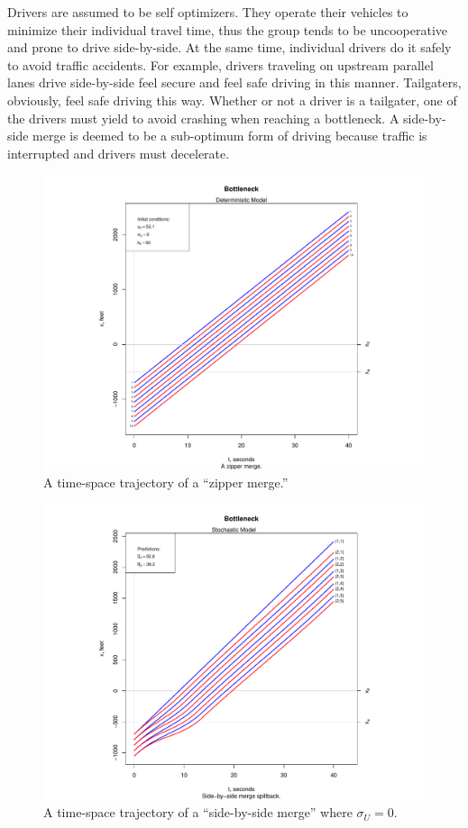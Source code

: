 \documentclass[Proceedings]{ascelike}
\begin{document}
Drivers are assumed to be self optimizers.  They operate their vehicles to minimize their individual travel time, thus the group tends to be uncooperative and prone to drive side-by-side. At the same time, individual drivers do it safely to avoid traffic accidents. For example, drivers traveling on upstream parallel lanes drive side-by-side feel secure and feel safe driving in this manner. Tailgaters, obviously, feel safe driving this way. Whether or not a driver is a tailgater, one of the drivers must yield to avoid crashing when reaching a bottleneck. A side-by-side merge is deemed to be a sub-optimum form of driving because traffic is interrupted and drivers must decelerate.  

\begin{figure}
\centering
\includegraphics[width = 5.5in]{Rplot01.pdf}
\caption{A time-space trajectory of a  ``zipper merge.'' }
\label{zip0}
\end{figure}


\begin{figure}
\centering
\includegraphics[width = 5.5in]{Rplot04.pdf}
\caption{A time-space trajectory of a ``side-by-side merge''  where $\sigma_U = 0$.}
\label{sbs0}
\end{figure}
\end{document}
